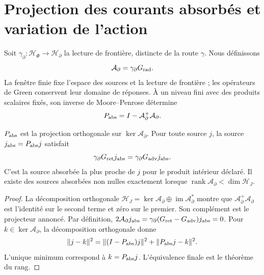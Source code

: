 \section{Projection des courants absorbés et variation de l'action}
\label{x_reciprocidad:vii:subsec:proyeccion-absorcion}

Soit \(\gamma_\partial:\mathcal H_\Phi\to\mathcal H_\partial\)
la lecture de frontière, distincte de la route \(\gamma\). Nous définissons
\[
 \mathcal A_\partial=\gamma_\partial G_{\rm rad}.
\]
La fenêtre finie fixe l'espace des sources et la lecture de frontière ;
les opérateurs de Green conservent leur domaine de réponses. À un niveau fini avec
des produits scalaires fixés, son inverse de
Moore--Penrose détermine
\begin{equation}
 P_{\rm abs}=I-\mathcal A_\partial^+\mathcal A_\partial.
 \label{x_reciprocidad:vii:eq:proyector-absorcion}
\end{equation}

\begin{theorem}
\label{x_reciprocidad:vii:thm:proyeccion-absorcion}
\(P_{\rm abs}\) est la projection orthogonale sur \(\ker\mathcal A_\partial\). Pour toute source \(j\), la source \(j_{\rm abs}=P_{\rm abs}j\) satisfait
\begin{equation}
 \gamma_\partial G_{\rm ret}j_{\rm abs}
 =\gamma_\partial G_{\rm adv}j_{\rm abs}.
 \label{x_reciprocidad:vii:eq:igualdad-borde-absorbido}
\end{equation}
C'est la source absorbée la plus proche de \(j\) pour le produit intérieur
déclaré. Il existe des sources absorbées non nulles exactement lorsque
\(\operatorname{rank}\mathcal A_\partial<\dim\mathcal H_J\).
\end{theorem}
\begin{proof}
La décomposition orthogonale
\(\mathcal H_J=\ker\mathcal A_\partial\oplus
 \operatorname{im}\mathcal A_\partial^*\) montre que
\(\mathcal A_\partial^+\mathcal A_\partial\) est l'identité
sur le second terme et zéro sur le premier. Son complément est le
projecteur annoncé. Par définition,
\(2\mathcal A_\partial j_{\rm abs}
 =\gamma_\partial(G_{\rm ret}-G_{\rm adv})j_{\rm abs}=0\).
Pour \(k\in\ker\mathcal A_\partial\), la décomposition orthogonale donne
\[
 \|j-k\|^2=\|(I-P_{\rm abs})j\|^2+\|P_{\rm abs}j-k\|^2.
\]
L'unique minimum correspond à \(k=P_{\rm abs}j\). L'équivalence finale est le théorème du rang.
\end{proof}


